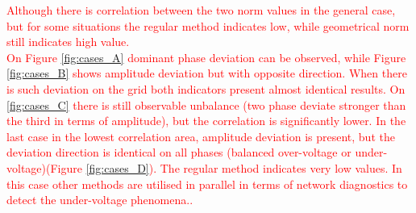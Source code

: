             \textcolor{red}{Although there is correlation between the two norm values in the general case, but for some situations the regular method indicates low, while geometrical norm still indicates high value.\\
            On Figure \ref{fig:cases_A} dominant phase deviation can be observed, while Figure \ref{fig:cases_B} shows amplitude deviation but with opposite direction. When there is such deviation on the grid both indicators present almost identical results. On \ref{fig:cases_C} there is still observable unbalance (two phase deviate stronger than the third in terms of amplitude), but the correlation is significantly lower. In the last case in the lowest correlation area, amplitude deviation is present, but the deviation direction is identical on all phases (balanced over-voltage or under-voltage)(Figure \ref{fig:cases_D}). The regular method indicates very low values. In this case other methods are utilised in parallel in terms of network diagnostics to detect the under-voltage phenomena.\cite{arn1997under-voltage}.}


